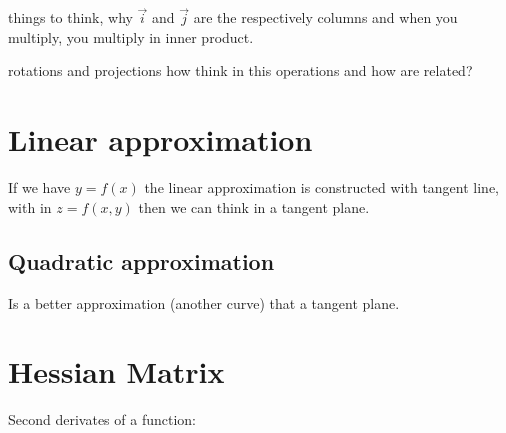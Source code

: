 \documentclass[10pt,a4paper]{article}
\begin{document}

things to think, why $\vec{i}$ and $\vec{j}$ are the respectively columns and when you multiply, you multiply in  inner product.


rotations and projections how think in this operations and how are related?




\section{Linear approximation}

If we have $ y = f(x)$ the linear approximation is constructed with tangent line, with in $z = f(x,y)$ then we can think in a tangent plane.


\subsection{Quadratic approximation}
Is a better approximation (another curve) that a tangent plane.



\section{Hessian Matrix}
Second derivates of a function: 
\end{document}
